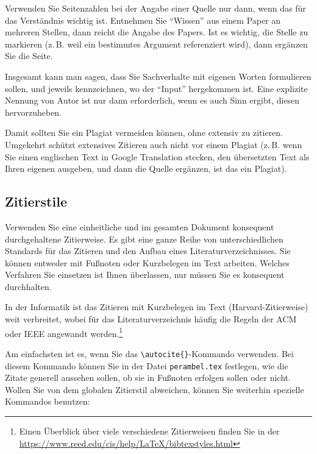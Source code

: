 \documentclass[conference,compsoc,final,a4paper]{IEEEtran}
\begin{document}
Verwenden Sie Seitenzahlen bei der Angabe einer Quelle nur dann, wenn das für das Verständnis wichtig ist. Entnehmen Sie \enquote{Wissen} aus einem Paper an mehreren Stellen, dann reicht die Angabe des Papers. Ist es wichtig, die Stelle zu markieren (z.\,B. weil ein bestimmtes Argument referenziert wird), dann ergänzen Sie die Seite.

Insgesamt kann man sagen, dass Sie Sachverhalte mit eigenen Worten formulieren sollen, und jeweils kennzeichnen, wo der \enquote{Input} hergekommen ist. Eine explizite Nennung von Autor ist nur dann erforderlich, wenn es auch Sinn ergibt, diesen hervorzuheben.

Damit sollten Sie ein Plagiat vermeiden können, ohne extensiv zu zitieren. Umgekehrt schützt extensives Zitieren auch nicht vor einem Plagiat (z.\,B. wenn Sie einen englischen Text in Google Translation stecken, den übersetzten Text als Ihren eigenen ausgeben, und dann die Quelle ergänzen, ist das ein Plagiat).

\subsection{Zitierstile}
Verwenden Sie eine einheitliche und im gesamten Dokument konsequent durchgehaltene Zitierweise. Es gibt eine ganze Reihe von unterschiedlichen Standards für das Zitieren und den Aufbau eines Literaturverzeichnisses. Sie können entweder mit Fußnoten oder Kurzbelegen im Text arbeiten. Welches Verfahren Sie einsetzen ist Ihnen überlassen, nur müssen Sie es konsequent durchhalten.

In der Informatik ist das Zitieren mit Kurzbelegen im Text (Harvard-Zitierweise) weit verbreitet, wobei für das Literaturverzeichnis häufig die Regeln der \acs{ACM} oder \acs{IEEE} angewandt werden.\footnote{Einen Überblick über viele verschiedene Zitierweisen finden Sie in der \url{https://www.reed.edu/cis/help/LaTeX/bibtexstyles.html}}

Am einfachsten ist es, wenn Sie das \lstinline+\autocite{}+-Kommando verwenden. Bei diesem Kommando können Sie in der Datei \texttt{perambel.tex} festlegen, wie die Zitate generell aussehen sollen, \zb{} ob sie in Fußnoten erfolgen sollen oder nicht. Wollen Sie von dem globalen Zitierstil abweichen, können Sie weiterhin spezielle Kommandos benutzen:
\end{document}
